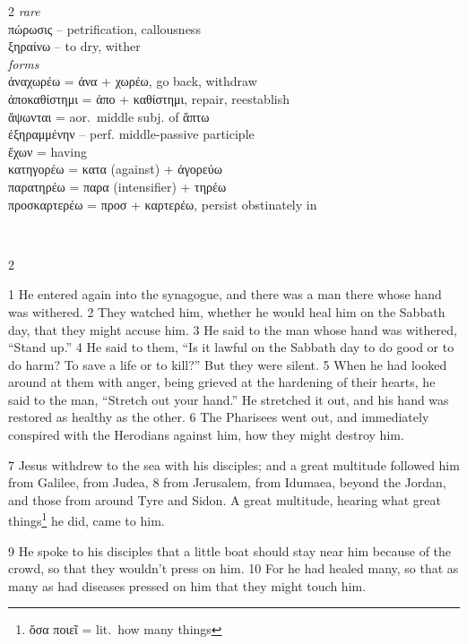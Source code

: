 \documentclass[10pt,a5paper,twoside,twocolumn]{book}
\newcommand*\cleartoleftpage{%
  \ifodd\value{page}\hbox{}\clearpage\fi
}
\newcommand{\separator}{
  \vspace{-0.5\baselineskip}%
  \hspace{0.27\textwidth}%
  \noindent\makebox[\linewidth]{\resizebox{0.3333\linewidth}{1pt}{$\bullet$}}\bigskip%
  \vspace{-0.5\baselineskip}
}
\newenvironment{facing}{\cleartoleftpage}{\clearpage\pagebreak}
\newenvironment{help}{\clearpage}{}
\newenvironment{helpsec}{\begin{minipage}[t]{\textwidth}\begin{multicols}{2}}{\end{multicols}\end{minipage}}
\newenvironment{vocab}{\begin{helpsec}}{\end{helpsec}}
\newenvironment{translation}{\separator\\\begin{helpsec}\footnotesize}{\end{helpsec}}
\begin{document}
\begin{facing}
\begin{help}
\begin{vocab}
\emph{rare}\\
πώρωσις -- petrification, callousness\\
ξηραίνω -- to dry, wither\\

\emph{forms}\\
ἀναχωρέω = ἀνα + χωρέω, go back, withdraw\\
ἀποκαθίστημι = ἀπο + καθίστημι, repair, reestablish\\
ἅψωνται = aor.~middle subj. of ἅπτω\\
ἐξηραμμένην -- perf. middle-passive participle\\
ἔχων = having\\
κατηγορέω = κατα (against) + ἀγορεύω \\
παρατηρέω = παρα (intensifier) + τηρέω\\
προσκαρτερέω = προσ + καρτερέω, persist obstinately in\\
\end{vocab}
\begin{translation}

 1 He entered again into the synagogue, and there was a man there whose hand was withered. 2 They watched him, whether he would heal him on the Sabbath day, that they might accuse him. 
3 He said to the man whose hand was withered, ``Stand up.'' 4 He said to them, ``Is it lawful on the Sabbath day to do good or to do harm? To save a life or to kill?'' But they were silent. 5 When he had looked around at them with anger, being grieved at the hardening of their hearts, he said to the man, ``Stretch out your hand.'' He stretched it out, and his hand was restored as healthy as the other. 
6 The Pharisees went out, and immediately conspired with the Herodians against him, how they might destroy him.

7 Jesus withdrew to the sea with his disciples; and a great multitude followed him from Galilee, from Judea, 8 from Jerusalem, from Idumaea, beyond the Jordan, and those from around Tyre and Sidon. A great multitude, hearing what great things\footnote{ὅσα ποιεῖ = lit.~how many things} he did, came to him. 

9 He spoke to his disciples that a little boat should stay near him because of the crowd, so that they wouldn't press on him. 10 For he had healed many, so that as many as had diseases pressed on him that they might touch him.

\end{translation}
\end{help}
\end{facing}
\end{document}
